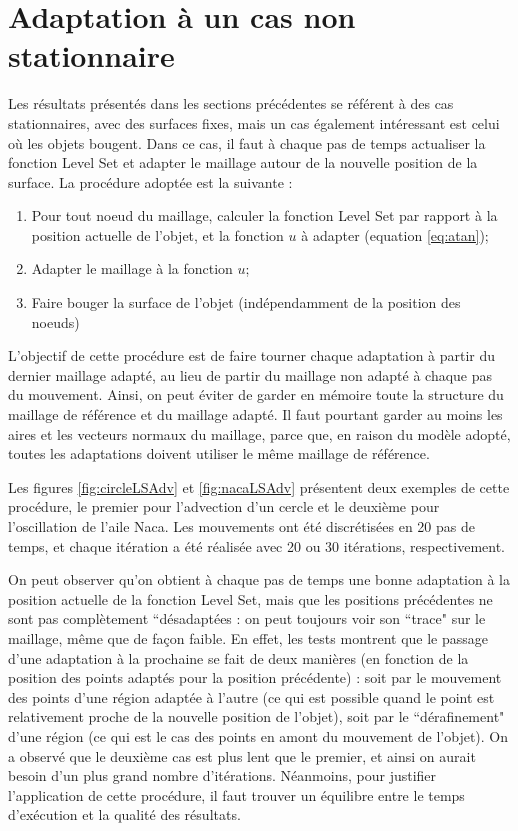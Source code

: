 \section{Adaptation à un cas non stationnaire}
\label{sec:nonstat}

\indent Les résultats présentés dans les sections précédentes se référent à des cas stationnaires, avec des surfaces fixes, mais un cas également intéressant est celui où les objets bougent. Dans ce cas, il faut à chaque pas de temps actualiser la fonction Level Set et adapter le maillage autour de la nouvelle position de la surface. La procédure adoptée est la suivante : 

\begin{enumerate}
	\item Pour tout noeud du maillage, calculer la fonction Level Set par rapport à la position actuelle de l'objet, et la fonction \(u\) à adapter (equation \eqref{eq:atan});
	\item Adapter le maillage à la fonction \(u\);
	\item Faire bouger la surface de l'objet (indépendamment de la position des noeuds)
\end{enumerate}

\indent L'objectif de cette procédure est de faire tourner chaque adaptation à partir du dernier maillage adapté, au lieu de partir du maillage non adapté à chaque pas du mouvement. Ainsi, on peut éviter de garder en mémoire toute la structure du maillage de référence et du maillage adapté. Il faut pourtant garder au moins les aires et les vecteurs normaux du maillage, parce que, en raison du modèle adopté, toutes les adaptations doivent utiliser le même maillage de référence.

\indent Les figures \ref{fig:circleLSAdv} et \ref{fig:nacaLSAdv} présentent deux exemples de cette procédure, le premier pour l'advection d'un cercle et le deuxième pour l'oscillation de l'aile Naca. Les mouvements ont été discrétisées en 20 pas de temps, et chaque itération a été réalisée avec 20 ou 30 itérations, respectivement.

\indent On peut observer qu'on obtient à chaque pas de temps une bonne adaptation à la position actuelle de la fonction Level Set, mais que les positions précédentes ne sont pas complètement ``désadaptées : on peut toujours voir son ``trace" sur le maillage, même que de façon faible. En effet, les tests montrent que le passage d'une adaptation à la prochaine se fait de deux manières (en fonction de la position des points adaptés pour la position précédente) : soit par le mouvement des points d'une région adaptée à l'autre (ce qui est possible quand le point est relativement proche de la nouvelle position de l'objet), soit par le ``dérafinement" d'une région (ce qui est le cas des points en amont du mouvement de l'objet). On a observé que le deuxième cas est plus lent que le premier, et ainsi on aurait besoin d'un plus grand nombre d'itérations. Néanmoins, pour justifier l'application de cette procédure, il faut trouver un équilibre entre le temps d'exécution et la qualité des résultats.

